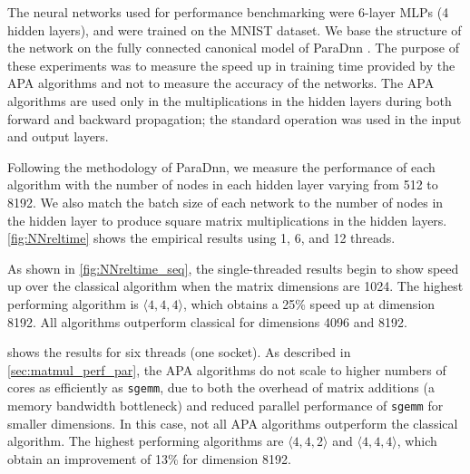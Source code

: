 \documentclass[conference]{IEEEtran}
\newcommand{\dims}[1]{\langle #1 \rangle}
\newcommand{\datafile}{}
\newcommand{\threads}{}
\begin{document}
\begin{figure*}[t!]
%
\subfloat[One thread]{
\centering
\renewcommand{\datafile}{data/NN_seq.dat}
\renewcommand{\threads}{1}

\label{fig:NNreltime_seq}}
%
\hfill
\subfloat[Six threads]{
\centering
\renewcommand{\datafile}{data/NN_par_6.dat}
\renewcommand{\threads}{6}

\label{fig:NNreltime_par_6}}
%
\hfill
\subfloat[Twelve threads]{
\centering
\renewcommand{\datafile}{data/NN_par_12.dat}
\renewcommand{\threads}{12}

\label{fig:NNreltime_par_12}}
%
\caption{Network training time relative to using classical matrix multiplication}
\label{fig:NNreltime}
\end{figure*}

The neural networks used for performance benchmarking were 6-layer MLPs (4 hidden layers), and were trained on the MNIST dataset. 
We base the structure of the network on the fully connected canonical model of ParaDnn \cite{WWB20}.
The purpose of these experiments was to measure the speed up in training time provided by the APA algorithms and not to measure the accuracy of the networks. 
The APA algorithms are used only in the multiplications in the hidden layers during both forward and backward propagation; the standard operation was used in the input and output layers. 

Following the methodology of ParaDnn, we measure the performance of each algorithm with the number of nodes in each hidden layer varying from 512 to 8192. 
We also match the batch size of each network to the number of nodes in the hidden layer to produce square matrix multiplications in the hidden layers. 
\cref{fig:NNreltime} shows the empirical results using 1, 6, and 12 threads.

As shown in \cref{fig:NNreltime_seq}, the single-threaded results begin to show speed up over the classical algorithm when the matrix dimensions are 1024.
The highest performing algorithm is $\dims{4,4,4}$, which obtains a 25\% speed up at dimension 8192. 
All algorithms outperform classical for dimensions 4096 and 8192.

 shows the results for six threads (one socket).
As described in \cref{sec:matmul_perf_par}, the APA algorithms do not scale to higher numbers of cores as efficiently as \texttt{sgemm}, due to both the overhead of matrix additions (a memory bandwidth bottleneck) and reduced parallel performance of \texttt{sgemm} for smaller dimensions.
In this case, not all APA algorithms outperform the classical algorithm.
The highest performing algorithms are $\dims{4,4,2}$ and $\dims{4,4,4}$, which obtain an improvement of 13\% for dimension 8192.
\end{document}
